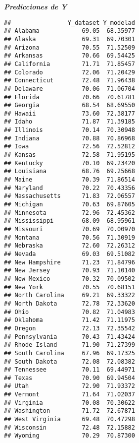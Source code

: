 \documentclass[]{article}
\newenvironment{Shaded}{\begin{snugshade}}{\end{snugshade}}
\newcommand{\KeywordTok}[1]{\textcolor[rgb]{0.13,0.29,0.53}{\textbf{#1}}}
\newcommand{\CommentTok}[1]{\textcolor[rgb]{0.56,0.35,0.01}{\textit{#1}}}
\newcommand{\OperatorTok}[1]{\textcolor[rgb]{0.81,0.36,0.00}{\textbf{#1}}}
\newcommand{\NormalTok}[1]{#1}
\begin{document}
\emph{\textbf{Predicciones de Y}}

\begin{Shaded}
\end{Shaded}

\begin{verbatim}
##                Y_dataset Y_modelad
## Alabama            69.05  68.35977
## Alaska             69.31  69.70301
## Arizona            70.55  71.52509
## Arkansas           70.66  69.54425
## California         71.71  71.85457
## Colorado           72.06  71.20429
## Connecticut        72.48  71.96438
## Delaware           70.06  71.06704
## Florida            70.66  70.61781
## Georgia            68.54  68.69550
## Hawaii             73.60  72.38177
## Idaho              71.87  71.39185
## Illinois           70.14  70.30948
## Indiana            70.88  70.86968
## Iowa               72.56  72.52812
## Kansas             72.58  71.95195
## Kentucky           70.10  69.23420
## Louisiana          68.76  69.25668
## Maine              70.39  71.86514
## Maryland           70.22  70.43356
## Massachusetts      71.83  72.06557
## Michigan           70.63  69.87605
## Minnesota          72.96  72.45362
## Mississippi        68.09  68.95961
## Missouri           70.69  70.00970
## Montana            70.56  71.30919
## Nebraska           72.60  72.26312
## Nevada             69.03  69.51082
## New Hampshire      71.23  71.84796
## New Jersey         70.93  71.10140
## New Mexico         70.32  70.09502
## New York           70.55  70.68151
## North Carolina     69.21  69.33322
## North Dakota       72.78  72.33620
## Ohio               70.82  71.04983
## Oklahoma           71.42  71.11975
## Oregon             72.13  72.35542
## Pennsylvania       70.43  71.43424
## Rhode Island       71.90  71.27399
## South Carolina     67.96  69.17325
## South Dakota       72.08  72.08382
## Tennessee          70.11  69.44971
## Texas              70.90  69.94504
## Utah               72.90  71.93372
## Vermont            71.64  71.02037
## Virginia           70.08  70.30622
## Washington         71.72  72.67871
## West Virginia      69.48  70.47298
## Wisconsin          72.48  72.15882
## Wyoming            70.29  70.87300
\end{verbatim}
\end{document}
